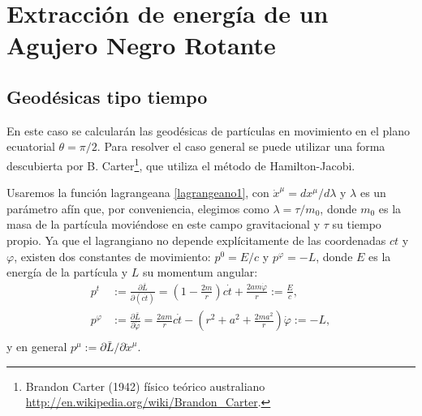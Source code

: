 %
%

\section{Extracción de energía de un Agujero Negro Rotante}

\subsection{Geodésicas tipo tiempo}

En este caso se calcularán las geodésicas de partículas en movimiento en el plano ecuatorial $\theta=\pi/2$. Para resolver el caso general se puede utilizar una forma descubierta por B. Carter\footnote{Brandon Carter (1942) físico teórico australiano \url{http://en.wikipedia.org/wiki/Brandon_Carter}.}, que utiliza el método de Hamilton-Jacobi.

Usaremos la función lagrangeana \eqref{lagrangeano1}, con $\dot{x}^{\mu}=dx^{\mu}/d \lambda$ y $\lambda$ es un parámetro afín que, por conveniencia, elegimos como $\lambda=\tau/m_0$, donde $m_0$ es la masa de la partícula moviéndose en este campo gravitacional y $\tau$ su tiempo propio. Ya que el lagrangiano no depende explícitamente de las coordenadas $ct$ y $\varphi$, existen dos constantes de movimiento: $p^0=E/c$ y $p^\varphi=-L$, donde $E$ es la energía de la partícula y $L$ su momentum angular:
\begin{equation}
\begin{aligned}
p^{t}&:=\frac{\partial \bar{L}}{\partial(c\dot{t})}=\left(1-\frac{2m}{r}\right)c\dot{t}+\frac{2am\dot{\varphi}}{r}:=\frac{E}{c},\\ 
p^{\varphi}&:=\frac{\partial \bar{L}}{\partial \dot{\varphi}}=\frac{2am}{r}c\dot{t}-\left(r^2+a^2+\frac{2ma^2}{r}\right)\dot{\varphi}:=-L,\\
\end{aligned}
\end{equation}
y en general $p^\mu:=\partial\bar{L}/\partial\dot{x}^\mu$.

